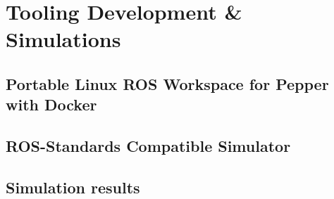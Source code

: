 
\chapter{Tooling Development \& Simulations} %

\label{Chapter5} %

\section{Portable Linux ROS Workspace for Pepper with Docker}


\section{ROS-Standards Compatible Simulator}


\section{Simulation results}
